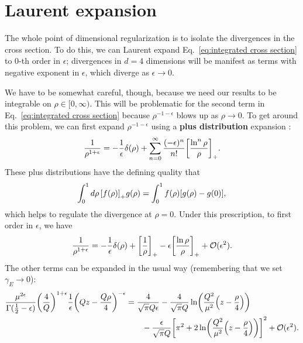 \documentclass[11pt,twoside,reqno]{amsart}
\theoremstyle{plain}
\theoremstyle{remark}
\theoremstyle{definition}
\theoremstyle{remark}
\theoremstyle{definition}
\theoremstyle{definition}
\newcommand{\cO}{\mathcal{O}}
\begin{document}
\section{Laurent expansion}

	The whole point of dimensional regularization is to isolate the divergences in the cross section. To do this, we can Laurent expand Eq.\ \ref{eq:integrated cross section} to $0$-th order in $\epsilon$; divergences in $d = 4$ dimensions will be manifest as terms with negative exponent in $\epsilon$, which diverge as $\epsilon \to 0$. 

	We have to be somewhat careful, though, because we need our results to be integrable on $\rho \in [0, \infty)$. This will be problematic for the second term in Eq.\ \ref{eq:integrated cross section} because $\rho^{-1 - \epsilon}$ blows up as $\rho \to 0$. To get around this problem, we can first expand $\rho^{-1 - \epsilon}$ using a \textbf{plus distribution} expansion \cite{lazopoulos_qcd_2007}:
	\begin{equation}
		\frac{1}{\rho^{1 + \epsilon}} = -\frac{1}{\epsilon}\delta(\rho) + \sum_{n = 0}^\infty \frac{(-\epsilon)^n}{n!}\qty[\frac{\ln^n \rho}{\rho}]_+.
	\end{equation}
	These plus distributions have the defining quality that
	\begin{equation}
		\int_0^1 d\rho\, \qty[f(\rho)]_+ g(\rho) = \int_0^1 f(\rho)\qty[g(\rho) - g(0)],
	\end{equation}
	which helps to regulate the divergence at $\rho = 0$. Under this prescription, to first order in $\epsilon$, we have
	\begin{equation}
		\frac{1}{\rho^{1 + \epsilon}} = -\frac{1}{\epsilon}\delta(\rho) + \qty[\frac{1}{\rho}]_+ - \epsilon \qty[\frac{\ln \rho}{\rho}]_+ + \cO(\epsilon^2).
	\end{equation}
	The other terms can be expanded in the usual way (remembering that we set $\gamma_E \to 0$):
	\begin{equation}
	\begin{aligned}
		\frac{\mu^{2\epsilon}}{\Gamma(\frac{1}{2} - \epsilon)} \qty(\frac{4}{Q})^{1+\epsilon}\frac{1}{\epsilon} \qty(Qz - \frac{Q\rho}{4})^{-\epsilon} &= \frac{4}{\sqrt{\pi}Q\epsilon} - \frac{4}{\sqrt{\pi}Q}\ln(\frac{Q^2}{\mu^2}\qty(z - \frac{\rho}{4})) \\
		&\qquad - \frac{\epsilon}{\sqrt{\pi}Q}\qty[\pi^2 + 2\ln(\frac{Q^2}{\mu^2}\qty(z - \frac{\rho}{4}))]^2 + \cO(\epsilon^2).
	\end{aligned}
	\end{equation}
\end{document}
